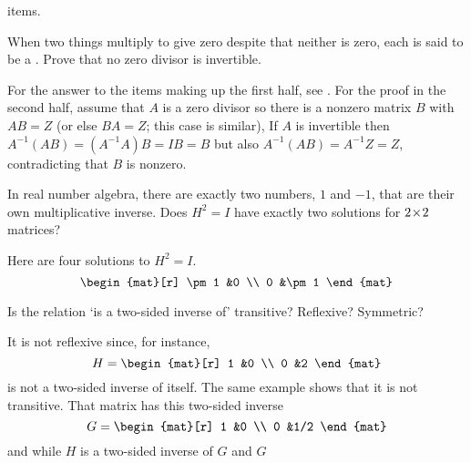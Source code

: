 \begin{exercises}
\begin{exparts}
        items.
    \end{exparts}
    When two things multiply to give zero despite that neither is zero, each is
    said to be a .
    Prove that no zero divisor is invertible.
    \begin{answer}
      For the answer to the items making up the first half, see 
      .
      For the proof in the second half, assume that $A$ is a zero divisor so
      there is a nonzero matrix $B$ with $AB=Z$ 
      (or else $BA=Z$; this case is similar), 
      If $A$ is invertible
      then $A^{-1}(AB)=(A^{-1}A)B=IB=B$ but also
      $A^{-1}(AB)=A^{-1}Z=Z$, contradicting that $B$ is nonzero.
    \end{answer}
  \item 
    In real number algebra, there are exactly two numbers, $1$ and $-1$, 
    that are their own multiplicative inverse.
    Does \( H^2=I \) have exactly two solutions for \( 2 \! \times \! 2 \)
    matrices?
    \begin{answer}
      Here are four solutions to \( H^2=I \).
      \begin{equation*}
        \begin{mat}[r]
          \pm 1  &0  \\
          0      &\pm 1
        \end{mat}
      \end{equation*}   
    \end{answer}
  \item 
   Is the relation `is a two-sided inverse of' transitive?
   Reflexive?
   Symmetric?
   \begin{answer}
     It is not reflexive since, for instance, 
     \begin{equation*}
       H=\begin{mat}[r]
         1  &0  \\
         0  &2
       \end{mat}
     \end{equation*}
     is not a two-sided inverse of itself.
     The same example shows that it is not transitive.
     That matrix has this two-sided inverse
     \begin{equation*}
       G=\begin{mat}[r]
         1  &0  \\
         0  &1/2
       \end{mat}
     \end{equation*}
     and while \( H \) is a two-sided inverse of \( G \) and \( G \)

\end{answer}
\end{exercises}
